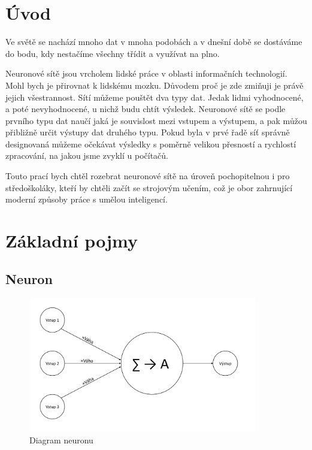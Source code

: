 \documentclass[12pt,a4paper]{report}
\begin{document}


\tableofcontents

\chapter{Úvod}
Ve světě se nachází mnoho dat v mnoha podobách a v dnešní době se dostáváme do bodu, kdy nestačíme všechny třídit a využívat na plno.

Neuronové sítě jsou vrcholem lidské práce v oblasti informačních technologií. Mohl bych je přirovnat k lidskému mozku. Důvodem proč je zde zmiňuji je právě jejich všestrannost. Sítí můžeme pouštět dva typy dat. Jedak lidmi vyhodnocené, a poté nevyhodnocené, u nichž budu chtít výsledek. Neuronové sítě se podle prvního typu dat naučí jaká je souvislost mezi vstupem a výstupem, a pak můžou přibližně určit výstupy dat druhého typu. Pokud byla v prvé řadě síť správně designovaná můžeme očekávat výsledky s poměrně velikou přesností a rychlostí zpracování, na jakou jsme zvyklí u počítačů.

Touto prací bych chtěl rozebrat neuronové sítě na úroveň pochopitelnou i pro středoškoláky, kteří by chtěli začít se strojovým učením, což je obor zahrnující moderní způsoby práce s umělou inteligencí.

\chapter{Základní pojmy} %

\section{Neuron}
	\begin{figure}[h]
		\centering
		\includegraphics[width=10cm]{neuron}
		\caption{Diagram neuronu}
	\end{figure}
\end{document}
